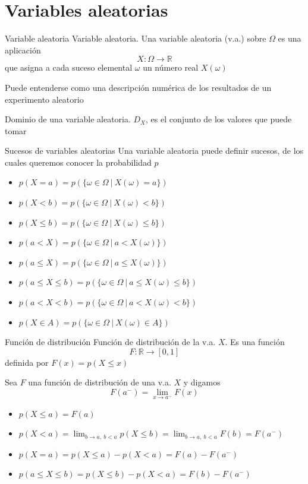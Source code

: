 \documentclass[
  ignorenonframetext,
]{beamer}
\providecommand{\tightlist}{%
  \setlength{\itemsep}{0pt}\setlength{\parskip}{0pt}}
\begin{document}
\hypertarget{variables-aleatorias}{%
\section{Variables aleatorias}\label{variables-aleatorias}}

\begin{frame}{Variable aleatoria}
\protect\hypertarget{variable-aleatoria}{}
Variable aleatoria. Una variable aleatoria (v.a.) sobre \(\Omega\) es
una aplicación \[X: \Omega\longrightarrow \mathbb{R}\] que asigna a cada
suceso elemental \(\omega\) un número real \(X(\omega)\)

Puede entenderse como una descripción numérica de los resultados de un
experimento aleatorio

Dominio de una variable aleatoria. \(D_X\), es el conjunto de los
valores que puede tomar
\end{frame}

\begin{frame}{Sucesos de variables aleatorias}
\protect\hypertarget{sucesos-de-variables-aleatorias}{}
Una variable aleatoria puede definir sucesos, de los cuales queremos
conocer la probabilidad \(p\)

\begin{itemize}
\tightlist
\item
  \(p(X=a) = p(\{\omega\in\Omega \ |\  X(\omega) = a\})\)
\item
  \(p(X<b) = p(\{\omega\in\Omega \ |\  X(\omega) < b\})\)
\item
  \(p(X\le b) = p(\{\omega\in\Omega \ |\  X(\omega) \le b\})\)
\item
  \(p(a<X) = p(\{\omega\in\Omega \ |\  a<X(\omega)\})\)
\item
  \(p(a\le X) = p(\{\omega\in\Omega \ |\  a\le X(\omega)\})\)
\item
  \(p(a\le X\le b) = p(\{\omega\in\Omega \ |\  a\le X(\omega) \le b\})\)
\item
  \(p(a< X< b) = p(\{\omega\in\Omega \ |\  a< X(\omega) < b\})\)
\item
  \(p(X\in A) = p(\{\omega\in\Omega \ |\  X(\omega)\in A\})\)
\end{itemize}
\end{frame}

\begin{frame}{Función de distribución}
\protect\hypertarget{funciuxf3n-de-distribuciuxf3n}{}
Función de distribución de la v.a. \(X\). Es una función
\[F:\mathbb{R}\longrightarrow [0,1]\] definida por \(F(x)=p(X\le x)\)

Sea \(F\) una función de distribución de una v.a. \(X\) y digamos
\[F(a^-)=\lim_{x\rightarrow a^-}F(x)\]

\begin{itemize}
\tightlist
\item
  \(p(X\le a)=F(a)\)
\item
  \(p(X<a)=\lim_{b\rightarrow a,\  b<a}p(X\le b) = \lim_{b\rightarrow a,\  b<a} F(b) = F(a^-)\)
\item
  \(p(X=a) = p(X\le a)-p(X<a)=F(a)-F(a^-)\)
\item
  \(p(a\le X\le b) = p(X\le b)-p(X< a)=F(b)-F(a^-)\)
\end{itemize}
\end{frame}
\end{document}
